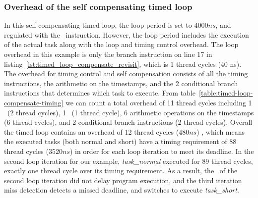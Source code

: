 \subsubsection{Overhead of the self compensating timed loop}
In this self compensating timed loop, the loop period is set to $4000ns$, and regulated with the \delayuntil\ instruction.
However, the loop period includes the execution of the actual task along with the loop and timing control overhead.
The loop overhead in this example is only the branch instruction on line 17 in listing~\ref{lst:timed_loop_compensate_revisit}, which is 1 thread cycles (40 ns).
The overhead for timing control and self compensation consists of all the timing instructions, the arithmetic on the timestamps, and the 2 conditional branch instructions that determines which task to execute.
From table~\ref{table:timed-loop-compensate-timing} we can count a total overhead of 11 thread cycles including 1 \gettime\ (2 thread cycles), 1 \delayuntil\ (1 thread cycle), 6 arithmetic operations on the timestamps (6 thread cycles), and 2 conditional branch instructions (2 thread cycles).
Overall the timed loop contains an overhead of 12 thread cycles ($480ns$) , which means the executed tasks (both normal and short) have a timing requirement of 88 thread cycles ($3520ns$) in order for each loop iteration to meet its deadline.  
In the second loop iteration for our example, \emph{task\_normal} executed for 89 thread cycles, exactly one thread cycle over its timing requirement. 
As a result, the \delayuntil\ of the second loop iteration did not delay program execution, and the third iteration miss detection detects a missed deadline, and switches to execute \emph{task\_short}. 

